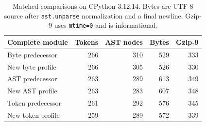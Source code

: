 \begin{table}[htbp]
\centering\small
\begin{tabular}{lrrrr}
\toprule
Complete module & Tokens & AST nodes & Bytes & Gzip-9\\
\midrule
Byte predecessor & 266 & 310 & 529 & 333\\
New byte profile & 266 & 305 & 526 & 330\\
AST predecessor & 263 & 289 & 613 & 349\\
New AST profile & 263 & 283 & 607 & 348\\
Token predecessor & 261 & 292 & 576 & 345\\
New token profile & 259 & 289 & 572 & 339\\
\bottomrule
\end{tabular}
\caption{Matched comparisons on CPython 3.12.14. Bytes are UTF-8 source after \texttt{ast.unparse} normalization and a final newline. Gzip-9 uses \texttt{mtime=0} and is informational.}\label{tab:metrics}
\end{table}
